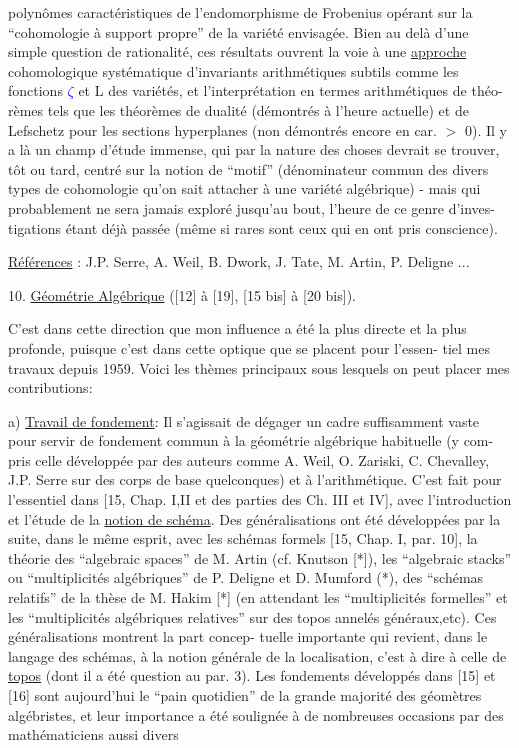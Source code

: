 \documentclass[11pt]{article}
\newcommand{\hand}[1]{\textcolor{blue}{#1}}
\newcommand{\uline}[1]{\underline{#1}}
\begin{document}
polynômes caractéristiques de l'endomorphisme de Frobenius opérant sur la
``cohomologie à support propre'' de la variété envisagée. Bien au delà d'une
simple question de rationalité, ces résultats ouvrent la voie à une \uline{approche}
cohomologique systématique d'invariants arithmétiques subtils comme les fonctions
\hand{$\zeta$} et L des variétés, et l'interprétation en termes arithmétiques de théo-%
rèmes tels que les théorèmes de dualité (démontrés à l'heure actuelle) et de
Lefschetz pour les sections hyperplanes (non démontrés encore en car. $>$ 0). Il
y a là un champ d'étude immense, qui par la nature des choses devrait se trouver,
tôt ou tard, centré sur la notion de ``motif'' (dénominateur commun des divers
types de cohomologie qu'on sait attacher à une variété algébrique) - mais qui
probablement ne sera jamais exploré jusqu'au bout, l'heure de ce genre d'inves-%
tigations étant déjà passée (même si rares sont ceux qui en ont pris conscience).

\uline{Références} : J.P. Serre, A. Weil, B. Dwork, J. Tate, M. Artin, P. Deligne ...

10. \uline{Géométrie Algébrique} ([12] à [19], [15 bis] à [20 bis]).

C'est dans cette direction que mon influence a été la plus directe et
la plus profonde, puisque c'est dans cette optique que se placent pour l'essen-%
tiel mes travaux depuis 1959. Voici les thèmes principaux sous lesquels on peut
placer mes contributions:

a) \uline{Travail de fondement}: Il s'agissait de dégager un cadre suffisamment vaste
pour servir de fondement commun à la géométrie algébrique habituelle (y com-%
pris celle développée par des auteurs comme A. Weil, O. Zariski, C. Chevalley,
J.P. Serre sur des corps de base quelconques) et à l'arithmétique. C'est fait
pour l'essentiel dans [15, Chap. I,II et des parties des Ch. III et IV], avec
l'introduction et l'étude de la \uline{notion de schéma}. Des généralisations ont été
développées par la suite, dans le même esprit, avec les schémas formels [15,
Chap. I, par. 10], la théorie des ``algebraic spaces'' de M. Artin (cf. Knutson
[*]), les ``algebraic stacks'' ou ``multiplicités algébriques'' de P. Deligne et
D. Mumford (*), des ``schémas relatifs'' de la thèse de M. Hakim [*] (en attendant
les ``multiplicités formelles'' et les ``multiplicités algébriques relatives'' sur
des topos annelés généraux,etc). Ces généralisations montrent la part concep-%
tuelle importante qui revient, dans le langage des schémas, à la notion générale
de la localisation, c'est à dire à celle de \uline{topos} (dont il a été question au
par. 3). Les fondements développés dans [15] et [16] sont aujourd'hui le ``pain
quotidien'' de la grande majorité des géomètres algébristes, et leur importance
a été soulignée à de nombreuses occasions par des mathématiciens aussi divers
\end{document}
